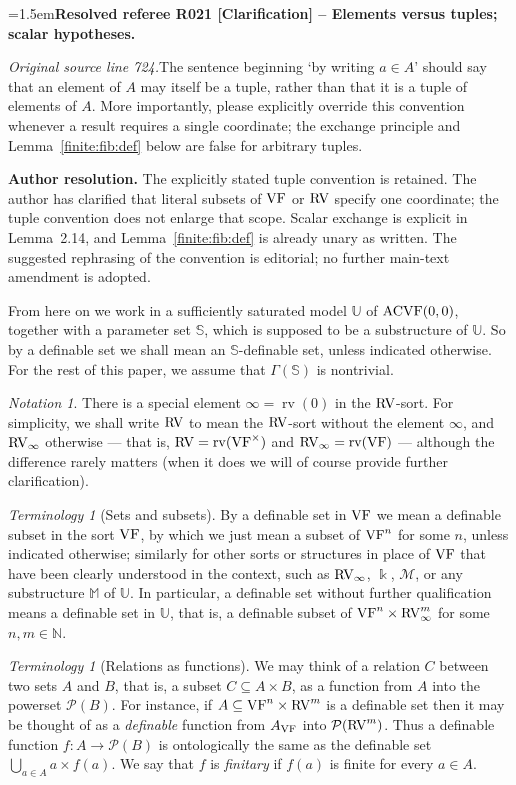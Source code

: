 \documentclass[12pt]{amsart}
\newcommand{\ResolvedRefereeRemark}[5]{%
  \par\medskip\begingroup\normalfont\small\color{gray}%
  \emergencystretch=1.5em\noindent\textbf{Resolved referee R#1 [#2] -- #3.}\par\nobreak\noindent #4\par
  \medskip\color{ResolutionGreen}\noindent\textbf{Author resolution.} #5\par
  \endgroup\medskip
}
\newcommand{\memph}[1]{{\color{magenta}\emph{#1}}}
\theoremstyle{plain}
\theoremstyle{definition}
\theoremstyle{remark}
\newtheorem{ter}[thm]{Terminology}
\newtheorem{nota}[thm]{Notation}
\numberwithin{equation}{section}
\theoremstyle{plain}
\newcommand{\VF}{\textup{VF}}
\newcommand{\ACVF}{\textup{ACVF}}
\newcommand{\RV}{\textup{RV}}
\newcommand{\MM}{\mdl M}
\DeclareMathOperator{\K}{\mathds{k}}
\newcommand{\N}{\mathds{N}}
\newcommand{\0}{\emptyset}
\newcommand{\mdl}[1]{\mathcal{#1}}  %
\newcommand{\bb}[1]{\mathbb{#1}}
\newcommand{\fun}{\longrightarrow}
\newcommand{\sub}{\subseteq}
\DeclareMathOperator{\rv}{rv}
\begin{document}
\ResolvedRefereeRemark{021}{Clarification}{Elements versus tuples; scalar hypotheses}{%
\textit{Original source line 724.}\quad The sentence beginning `by writing $a\in A$' should say that an element of $A$ may itself be a tuple, rather than that it is a tuple of elements of $A$. More importantly, please explicitly override this convention whenever a result requires a single coordinate; the exchange principle and Lemma~\ref{finite:fib:def} below are false for arbitrary tuples.
}{The explicitly stated tuple convention is retained. The author has clarified that literal subsets of $\VF$ or $\RV$ specify one coordinate; the tuple convention does not enlarge that scope. Scalar exchange is explicit in Lemma~2.14, and Lemma~\ref{finite:fib:def} is already unary as written. The suggested rephrasing of the convention is editorial; no further main-text amendment is adopted.}

From here on we work in a sufficiently saturated model $\bb U$ of $\ACVF(0,0)$, together with a parameter  set $\mathbb{S}$, which is supposed to be a substructure of $\bb U$. So by a definable set  we shall mean an $\bb S$-definable set, unless indicated otherwise. For the rest of this paper, we assume that $\Gamma(\mathbb S)$ is nontrivial.

\begin{nota}
There is a special element $\infty = \rv(0)$ in the $\RV$-sort. For simplicity, we shall write $\RV$ to mean the $\RV$-sort without the element $\infty$, and $\RV_\infty$ otherwise --- that is, $\RV = \rv(\VF^\times)$ and $\RV_\infty = \rv(\VF)$ --- although the difference rarely matters (when it does we will of course provide further clarification).
\end{nota}

\begin{ter}[Sets and subsets]\label{nota:sub}
By a definable set in $\VF$ we mean a definable subset in the sort $\VF$, by which we just mean a subset of $\VF^n$ for some $n$, unless indicated otherwise; similarly for other sorts or structures  in place of $\VF$ that have been clearly understood in the context, such as $\RV_\infty$, $\K$, $\MM$, or any substructure $\bb M$ of $\bb U$. In particular,  a definable set without further qualification means a definable set in $\bb U$, that is, a  definable subset of $\VF^n \times \RV^m_\infty$ for some $n, m \in \N$.
\end{ter}

\begin{ter}[Relations as functions]
We may think of a relation $C$ between two sets $A$ and $B$, that is, a subset $C \sub A \times B$, as a function from $A$ into the powerset $\mdl P(B)$. For instance, if $A \sub \VF^n \times \RV^m$ is a definable set then it may be thought of as a \memph{definable} function from $A_{\VF}$ into  $\mdl P(\RV^m)$. Thus a definable function $f : A \fun \mdl P(B)$ is ontologically the same as the definable set $\bigcup_{a \in A} a \times f(a)$. We say that $f$ is \memph{finitary} if $f(a)$ is finite for every $a \in A$.
\end{ter}
\end{document}
